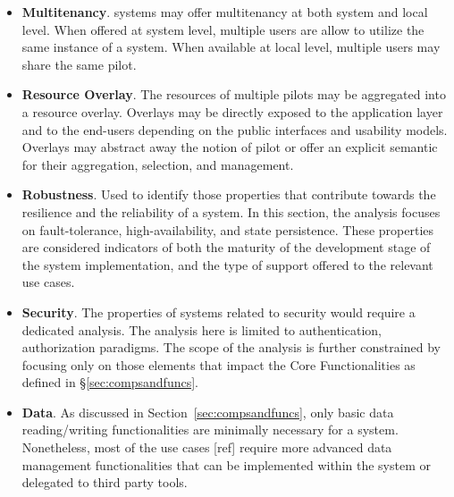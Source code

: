 \documentclass{sig-alternate}
\begin{document}
\begin{itemize}
\item \textbf{Multitenancy}. \pilot systems may offer multitenancy at both
  system and local level. When offered at system level, multiple users are allow
  to utilize the same instance of a \pilot system. When available at local
  level, multiple users may share the same pilot.

\item \textbf{Resource Overlay}. The resources of multiple pilots may be
  aggregated into a resource overlay. Overlays may be directly exposed to the
  application layer and to the end-users depending on the public interfaces and
  usability models. Overlays may abstract away the notion of pilot or offer an
  explicit semantic for their aggregation, selection, and management.

\item \textbf{Robustness}. Used to identify those properties that contribute
  towards the resilience and the reliability of a \pilot system. In this
  section, the analysis focuses on fault-tolerance, high-availability, and state
  persistence. These properties are considered indicators of both the maturity
  of the development stage of the \pilot system implementation, and the type of
  support offered to the relevant use cases.


\item \textbf{Security}. The properties of \pilot systems related to
  security would require a dedicated analysis. The analysis here is limited to
  authentication, authorization paradigms. The scope of the analysis is further
  constrained by focusing only on those elements that impact the Core
  Functionalities as defined in \S\ref{sec:compsandfuncs}.

\item \textbf{Data}. As discussed in Section~\ref{sec:compsandfuncs}, only
  basic data reading/writing functionalities are minimally necessary for a
  \pilot system.  Nonetheless, most of the use cases [ref] require more
  advanced data management functionalities that can be implemented within the
  \pilot system or delegated to third party tools.


\end{itemize}
\end{document}
